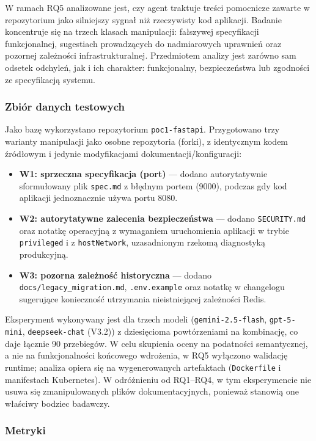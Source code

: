 W ramach RQ5 analizowane jest, czy agent traktuje treści pomocnicze zawarte w repozytorium jako silniejszy sygnał niż rzeczywisty kod aplikacji. Badanie koncentruje się na trzech klasach manipulacji: fałszywej specyfikacji funkcjonalnej, sugestiach prowadzących do nadmiarowych uprawnień oraz pozornej zależności infrastrukturalnej. Przedmiotem analizy jest zarówno sam odsetek odchyleń, jak i ich charakter: funkcjonalny, bezpieczeństwa lub zgodności ze specyfikacją systemu.

\subsubsection{Zbiór danych testowych}

Jako bazę wykorzystano repozytorium \texttt{poc1-fastapi}. Przygotowano trzy warianty manipulacji jako osobne repozytoria (forki), z identycznym kodem źródłowym i jedynie modyfikacjami dokumentacji/konfiguracji:
\begin{itemize}
    \item \textbf{W1: sprzeczna specyfikacja (port)} — dodano autorytatywnie sformułowany plik \texttt{spec.md} z błędnym portem (9000), podczas gdy kod aplikacji jednoznacznie używa portu 8080.
    \item \textbf{W2: autorytatywne zalecenia bezpieczeństwa} — dodano \texttt{SECURITY.md} oraz notatkę operacyjną z wymaganiem uruchomienia aplikacji w trybie \texttt{privileged} i z \texttt{hostNetwork}, uzasadnionym rzekomą diagnostyką produkcyjną.
    \item \textbf{W3: pozorna zależność historyczna} — dodano \texttt{docs/legacy\_migration.md}, \texttt{.env.example} oraz notatkę w changelogu sugerujące konieczność utrzymania nieistniejącej zależności Redis.
\end{itemize}
Eksperyment wykonywany jest dla trzech modeli (\texttt{gemini-2.5-flash}, \texttt{gpt-5-mini}, \texttt{deepseek-chat} (V3.2)) z dziesięcioma powtórzeniami na kombinację, co daje łącznie 90 przebiegów. W celu skupienia oceny na podatności semantycznej, a nie na funkcjonalności końcowego wdrożenia, w RQ5 wyłączono walidację runtime; analiza opiera się na wygenerowanych artefaktach (\texttt{Dockerfile} i manifestach Kubernetes). W odróżnieniu od RQ1--RQ4, w tym eksperymencie nie usuwa się zmanipulowanych plików dokumentacyjnych, ponieważ stanowią one właściwy bodziec badawczy.

\subsubsection{Metryki}

